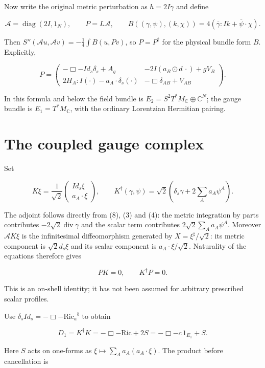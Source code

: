 Now write the original metric perturbation as $h=2I\gamma$ and define

\[
 \mathcal A=\operatorname{diag}(2I,1_N),\qquad
 P=L\mathcal A,\qquad
 B((\gamma,\psi),(k,\chi))
 =4(\overline\gamma:Ik+\overline\psi\cdot\chi).
 \tag{8}
\]

Then $S''(\mathcal Au,\mathcal Av)=-\tfrac14\int B(u,Pv)$, so $P=P^\dagger$ for the physical bundle form $B$. Explicitly,

\[
 P=\begin{pmatrix}
 -\Box-I d_s\delta_s+A_g&-2I(a_B\odot d\,\cdot)+gV_B\\
 2H_A:I(\cdot)-a_A\cdot\delta_s(\cdot)&-\Box\delta_{AB}+V_{AB}
 \end{pmatrix}.
 \tag{9}
\]

In this formula and below the field bundle is $E_2=S^2T^*M_\mathbb C\oplus\mathbb C^N$; the gauge bundle is $E_1=T^*M_\mathbb C$, with the ordinary Lorentzian Hermitian pairing.

\section{The coupled gauge complex}

Set

\[
 K\xi=\frac1{\sqrt2}\begin{pmatrix}I d_s\xi\\a_A\cdot\xi\end{pmatrix},
 \qquad
 K^\dagger(\gamma,\psi)=\sqrt2\left(\delta_s\gamma+2\sum_Aa_A\psi^A\right).
 \tag{10}
\]

The adjoint follows directly from (8), (3) and (4): the metric integration by parts contributes $-2\sqrt2\operatorname{div}\gamma$ and the scalar term contributes $2\sqrt2\sum_Aa_A\psi^A$. Moreover $\mathcal AK\xi$ is the infinitesimal diffeomorphism generated by $X=\xi^\sharp/\sqrt2$: its metric component is $\sqrt2d_s\xi$ and its scalar component is $a_A\cdot\xi/\sqrt2$. Naturality of the equations therefore gives

\[
 PK=0,\qquad K^\dagger P=0.
 \tag{11}
\]

This is an on-shell identity; it has not been assumed for arbitrary prescribed scalar profiles.

Use $\delta_sId_s=-\Box-\mathrm{Ric}_a{}^b$ to obtain

\[
 D_1=K^\dagger K=-\Box-\mathrm{Ric}+2S
 =-\Box-c\,1_{E_1}+S.
 \tag{12}
\]

Here $S$ acts on one-forms as $\xi\mapsto\sum_Aa_A(a_A\cdot\xi)$. The product before cancellation is

